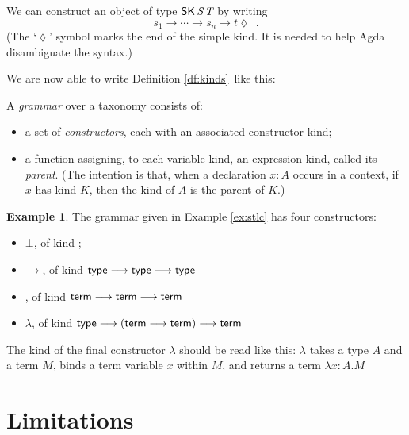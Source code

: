 \documentclass{article}
\theoremstyle{definition}
\newtheorem{example}{Example}[section]
\begin{document}

We can construct an object of type $\AgdaDatatype{SK} \, \AgdaBound{S} \, \AgdaBound{T}$ by writing 
$$ s_1 \longrightarrow \cdots \longrightarrow s_n \longrightarrow t \lozenge \enspace . $$
(The `$\lozenge$' symbol marks
the end of the simple kind.  It is needed to help Agda disambiguate the syntax.)

We are now able to write Definition \ref{df:kinds} like this:


A \emph{grammar} over a taxonomy consists of:
\begin{itemize}
\item
a set of \emph{constructors}, each with an associated constructor kind;
\item
a function assigning, to each variable kind, an expression kind, called its \emph{parent}.  (The intention is that, when a declaration $x : A$ occurs in a context, if $x$ has kind $K$, then the kind of $A$ is the parent of $K$.)
\end{itemize}


\begin{example}
The grammar given in Example \ref{ex:stlc} has four constructors:
\begin{itemize}
 \item
$\bot$, of kind ;
\item
$\rightarrow$, of kind $\AgdaFunction{type} \longrightarrow \AgdaFunction{type} \longrightarrow \AgdaFunction{type}$
\item
{}, of kind $\AgdaFunction{term} \longrightarrow \AgdaFunction{term} \longrightarrow \AgdaFunction{term}$
\item
$\lambda$, of kind $\AgdaFunction{type} \longrightarrow (\AgdaFunction{term} \longrightarrow \AgdaFunction{term}) \longrightarrow \AgdaFunction{term}$
\end{itemize}
The kind of the final constructor $\lambda$ should be read like this: $\lambda$ takes a type $A$
and a term $M$, binds a term variable $x$ within $M$, and returns a term $\lambda x:A.M$

\end{example}

\section{Limitations}
\end{document}

